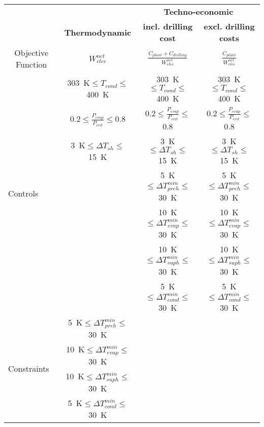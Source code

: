 \begin{tabular}{|c | c | c | c |}
    \hline
    \rowcolor{bluepoli!40} %
       &  & \multicolumn{2}{c|}{\textbf{Techno-economic}} \T\B \\
    \rowcolor{bluepoli!40} %
       & \textbf{Thermodynamic} & \textbf{incl. drilling cost} & \textbf{excl. drilling costs} \T\B \\
    \hline \hline
    Objective Function & \(W_{elec}^{net}\) & \(\frac{C_{plant} + C_{drilling}}{W_{elec}^{net}}\) & \(\frac{C_{plant}}{W_{elec}^{net}}\) \T\B \\
    \hline
    \multicolumn{1}{|l|}{\multirow{7}{*}{Controls}} & \qty{303}{\K}\(\leq T_{cond}\leq\)\qty{400}{\K} & \qty{303}{\K}\(\leq T_{cond}\leq\)\qty{400}{\K} & \qty{303}{\K}\(\leq T_{cond}\leq\)\qty{400}{\K} \T\B \\
    \multicolumn{1}{|l|}{} & \num{0.2}\(\leq \frac{P_{evap}}{P_{crit}}\leq\)\num{0.8} & \num{0.2}\(\leq \frac{P_{evap}}{P_{crit}}\leq\)\num{0.8} & \num{0.2}\(\leq \frac{P_{evap}}{P_{crit}}\leq\)\num{0.8} \T\B \\
    \multicolumn{1}{|l|}{} & \qty{3}{\K}\(\leq \Delta T_{sh}\leq\)\qty{15}{\K} & \qty{3}{\K}\(\leq \Delta T_{sh}\leq\)\qty{15}{\K} & \qty{3}{\K}\(\leq \Delta T_{sh}\leq\)\qty{15}{\K} \T\B \\
    \multicolumn{1}{|l|}{}  &   & \qty{5}{\K}\(\leq \Delta T_{preh}^{min}\leq\)\qty{30}{\K} & \qty{5}{\K}\(\leq \Delta T_{preh}^{min}\leq\)\qty{30}{\K} \T\B \\
    \multicolumn{1}{|l|}{}  &   & \qty{10}{\K}\(\leq \Delta T_{evap}^{min}\leq\)\qty{30}{\K} & \qty{10}{\K}\(\leq \Delta T_{evap}^{min}\leq\)\qty{30}{\K} \T\B \\
    \multicolumn{1}{|l|}{} &   & \qty{10}{\K}\(\leq \Delta T_{suph}^{min}\leq\)\qty{30}{\K} & \qty{10}{\K}\(\leq \Delta T_{suph}^{min}\leq\)\qty{30}{\K} \T\B \\
    \multicolumn{1}{|l|}{} &   & \qty{5}{\K}\(\leq \Delta T_{cond}^{min}\leq\)\qty{30}{\K} & \qty{5}{\K}\(\leq \Delta T_{cond}^{min}\leq\)\qty{30}{\K} \T\B \\
    \hline
    \multicolumn{1}{|l|}{\multirow{4}{*}{Constraints}} & \qty{5}{\K}\(\leq \Delta T_{preh}^{min}\leq\)\qty{30}{\K} &   &   \T\B \\
    \multicolumn{1}{|l|}{}  & \qty{10}{\K}\(\leq \Delta T_{evap}^{min}\leq\)\qty{30}{\K} &  &  \T\B \\
    \multicolumn{1}{|l|}{} & \qty{10}{\K}\(\leq \Delta T_{suph}^{min}\leq\)\qty{30}{\K} &  &  \T\B \\
    \multicolumn{1}{|l|}{} & \qty{5}{\K}\(\leq \Delta T_{cond}^{min}\leq\)\qty{30}{\K} &  &  \T\B \\
    \hline
\end{tabular}